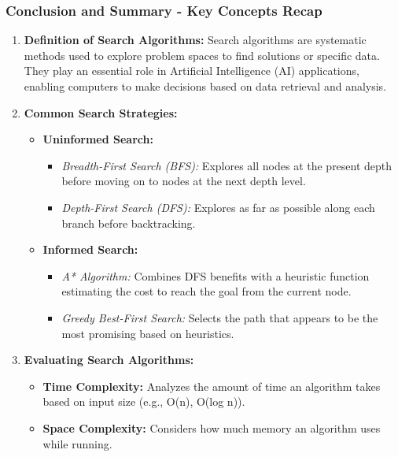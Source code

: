 \documentclass[aspectratio=169]{beamer}
\begin{document}
\begin{frame}[fragile]
    \frametitle{Conclusion and Summary - Key Concepts Recap}
    \begin{enumerate}
        \item \textbf{Definition of Search Algorithms:}
            Search algorithms are systematic methods used to explore problem spaces to find solutions or specific data. They play an essential role in Artificial Intelligence (AI) applications, enabling computers to make decisions based on data retrieval and analysis.

        \item \textbf{Common Search Strategies:}
            \begin{itemize}
                \item \textbf{Uninformed Search:}
                    \begin{itemize}
                        \item \textit{Breadth-First Search (BFS):} Explores all nodes at the present depth before moving on to nodes at the next depth level.
                        \item \textit{Depth-First Search (DFS):} Explores as far as possible along each branch before backtracking.
                    \end{itemize}
                \item \textbf{Informed Search:}
                    \begin{itemize}
                        \item \textit{A* Algorithm:} Combines DFS benefits with a heuristic function estimating the cost to reach the goal from the current node.
                        \item \textit{Greedy Best-First Search:} Selects the path that appears to be the most promising based on heuristics.
                    \end{itemize}
            \end{itemize}

        \item \textbf{Evaluating Search Algorithms:}
            \begin{itemize}
                \item \textbf{Time Complexity:} Analyzes the amount of time an algorithm takes based on input size (e.g., O(n), O(log n)).
                \item \textbf{Space Complexity:} Considers how much memory an algorithm uses while running.
            \end{itemize}
    \end{enumerate}

\end{frame}
\end{document}
